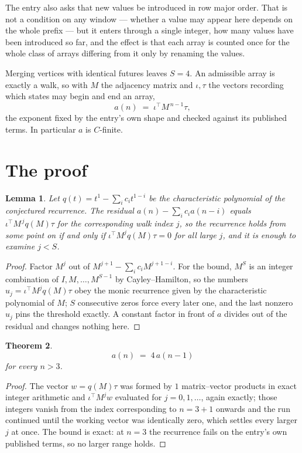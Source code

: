 \documentclass[11pt,a4paper]{article}
\theoremstyle{plain}
\newtheorem{theorem}{Theorem}
\newtheorem{lemma}[theorem]{Lemma}
\theoremstyle{definition}
\begin{document}
The entry also asks that new values be introduced in row major order. That is not a condition on any window --- whether a value may appear here depends on the whole prefix --- but it enters through a single integer, how many values have been introduced so far, and the effect is that each array is counted once for the whole class of arrays differing from it only by renaming the values.

Merging vertices with identical futures leaves $S=4$. An admissible array is exactly a walk, so with $M$ the adjacency matrix and $\iota,\tau$ the vectors recording which states may begin and end an array,
\[
a(n)\;=\;\iota^{\!\top}M^{\,n-1}\tau ,
\]
the exponent fixed by the entry's own shape and checked against its published terms. In
particular $a$ is $C$-finite.

\section{The proof}

\begin{lemma}\label{lem:crit}
Let $q(t)=t^{1}-\sum_i c_it^{1-i}$ be the characteristic polynomial of the
conjectured recurrence. The residual $a(n)-\sum_ic_ia(n-i)$ equals
$\iota^{\!\top}M^{\,j}q(M)\tau$ for the corresponding walk index $j$, so the recurrence
holds from some point on if and only if $\iota^{\!\top}M^{j}q(M)\tau=0$ for all large $j$,
and it is enough to examine $j<S$.
\end{lemma}

\begin{proof}
Factor $M^{j}$ out of $M^{j+1}-\sum_ic_iM^{j+1-i}$. For the bound, $M^{S}$
is an integer combination of $I,M,\dots,M^{S-1}$ by Cayley--Hamilton, so the numbers
$u_j=\iota^{\!\top}M^{j}q(M)\tau$ obey the monic recurrence given by the characteristic
polynomial of $M$; $S$ consecutive zeros force every later one, and the last nonzero $u_j$
pins the threshold exactly. A constant factor in front of $a$ divides out of the residual and
changes nothing here.
\end{proof}

\begin{theorem}
\[
a(n)\;=\;4\,a(n-1)
\]
for every $n>3$.
\end{theorem}

\begin{proof}
The vector $w=q(M)\tau$ was formed by $1$ matrix--vector products in exact integer
arithmetic and $\iota^{\!\top}M^{j}w$ evaluated for $j=0,1,\dots$, again exactly; those
integers vanish from the index corresponding to $n=3+1$ onwards and the run continued
until the working vector was identically zero, which settles every larger $j$ at once. The bound is exact: at $n=3$ the recurrence fails on the entry's own published terms, so no larger range holds.
\end{proof}
\end{document}
